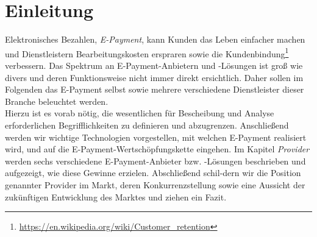\clearpage
{}
\section{Einleitung}
Elektronisches Bezahlen, \emph{E-Payment}, kann Kunden das Leben einfacher machen und Dienstleistern Bearbeitungskosten erspraren sowie die Kundenbindung\footnote{\url{https://en.wikipedia.org/wiki/Customer\_retention}} verbessern. Das Spektrum an E-Payment-Anbietern und \mbox{-Lö}sungen ist groß wie divers und deren Funktionsweise nicht immer direkt ersichtlich. Daher sollen im Folgenden das E-Payment selbst sowie mehrere verschiedene Dienstleister dieser Branche beleuchtet werden.\\
Hierzu ist es vorab nötig, die wesentlichen für Bescheibung und Analyse erforderlichen Begrifflichkeiten zu definieren und abzugrenzen. Anschließend werden wir wichtige Technologien vorgestellen, mit welchen E-Payment realisiert wird, und auf die E-Payment-Wertschöpfungskette eingehen. Im Kapitel \emph{Provider} werden sechs verschiedene E-Payment-Anbieter bzw. \mbox{-Lö}sungen beschrieben und aufgezeigt, wie diese Gewinne erzielen. Abschließend schil-dern wir die Position genannter Provider im Markt, deren Konkurrenzstellung sowie eine Aussicht der zukünftigen Entwicklung des Marktes und ziehen ein Fazit.
